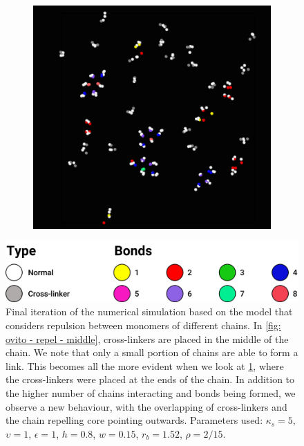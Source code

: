 \documentclass[../../main.tex]{subfiles}
\begin{document}
\begin{figure}[h]
\begin{subfigure}[b]{0.47\textwidth}
                \includegraphics[width=\textwidth]{Figures/ends_ovito.png}
                \caption{}
                \label{fig: ovito - repel - ext}
            \end{subfigure}
            \hspace*{\fill}
            \begin{minipage}[t]{\textwidth}
                \centering
                \includegraphics[scale=0.07]{Figures/legenda2.png}
            \end{minipage}
            \caption{Final iteration of the numerical simulation based on the model that considers repulsion between monomers of different chains. In \cref{fig: ovito - repel - middle}, cross-linkers are placed in the middle of the chain. We note that only a small portion of chains are able to form a link. This becomes all the more evident when we look at \cref{fig: ovito - repel - ext}, where the cross-linkers were placed at the ends of the chain. In addition to the higher number of chains interacting and bonds being formed, we observe a new behaviour, with the overlapping of cross-linkers and the chain repelling core pointing outwards. Parameters used: $\kappa_s = 5$, $\upsilon = 1$, $\epsilon = 1$, $h = 0.8$, $w = 0.15$, $r_b = 1.52$, $\rho = 2/15$.}
            \label{fig: ovito - repel}
        \end{figure}   
    
\end{document}
